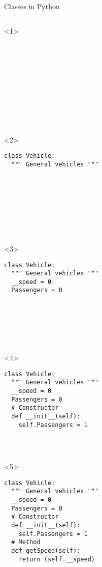
\begin{frame}[fragile]{Classes in Python}

  \begin{columns}[onlytextwidth]
    \begin{column}{\textwidth}

      \begin{onlyenv}<1>
        \begin{lstlisting}[style=python]











 \end{lstlisting}
      \end{onlyenv}

      \begin{onlyenv}<2>
        \begin{lstlisting}[style=python]
class Vehicle:
  """ General vehicles """









 \end{lstlisting}
      \end{onlyenv}

      \begin{onlyenv}<3>
        \begin{lstlisting}[style=python]
class Vehicle:
  """ General vehicles """
  __speed = 0
  Passengers = 0







 \end{lstlisting}
      \end{onlyenv}

      \begin{onlyenv}<4>
        \begin{lstlisting}[style=python]
class Vehicle:
  """ General vehicles """
  __speed = 0
  Passengers = 0
  # Constructor
  def __init__(self):
    self.Passengers = 1




 \end{lstlisting}
      \end{onlyenv}

      \begin{onlyenv}<5>
        \begin{lstlisting}[style=python]
class Vehicle:
  """ General vehicles """
  __speed = 0
  Passengers = 0
  # Constructor
  def __init__(self):
    self.Passengers = 1
  # Method
  def getSpeed(self):
    return (self.__speed)


\end{lstlisting}
\end{onlyenv}
\end{column}
\end{columns}
\end{frame}
